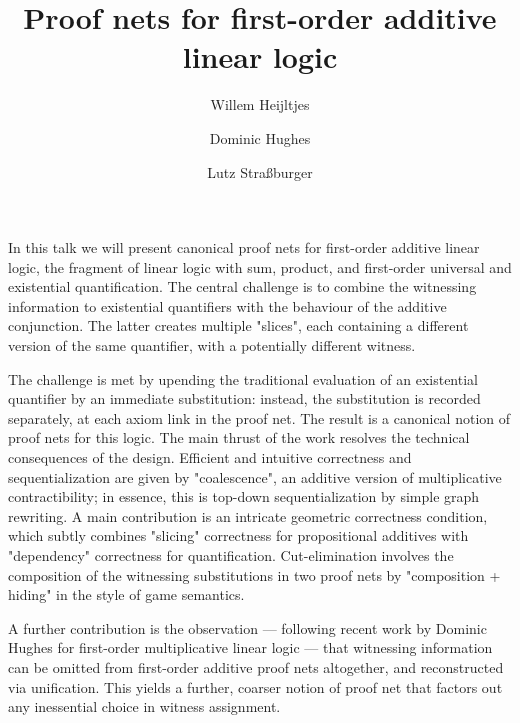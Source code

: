 \documentclass[a4paper,11pt]{article}
\def\urladdr#1{\endgraf\noindent{\it URL Address}: {\tt #1}.}
\begin{document}
\thispagestyle{empty}

\title{Proof nets for first-order additive linear logic}

\author{Willem Heijltjes \and Dominic Hughes \and Lutz Stra{\ss}burger}

\maketitle

In this talk we will present canonical proof nets for first-order additive linear logic, the fragment of linear logic with sum, product, and first-order universal and existential quantification. The central challenge is to combine the witnessing information to existential quantifiers with the behaviour of the additive conjunction. The latter creates multiple "slices", each containing a different version of the same quantifier, with a potentially different witness.

The challenge is met by upending the traditional evaluation of an existential quantifier by an immediate substitution: instead, the substitution is recorded separately, at each axiom link in the proof net. The result is a canonical notion of proof nets for this logic. The main thrust of the work resolves the technical consequences of the design. Efficient and intuitive correctness and sequentialization are given by "coalescence", an additive version of multiplicative contractibility; in essence, this is top-down sequentialization by simple graph rewriting. A main contribution is an intricate geometric correctness condition, which subtly combines "slicing" correctness for propositional additives with "dependency" correctness for quantification. Cut-elimination involves the composition of the witnessing substitutions in two proof nets by "composition + hiding" in the style of game semantics.

A further contribution is the observation --- following recent work by Dominic Hughes for first-order multiplicative linear logic --- that witnessing information can be omitted from first-order additive proof nets altogether, and reconstructed via unification. This yields a further, coarser notion of proof net that factors out any inessential choice in witness assignment.
\end{document}
